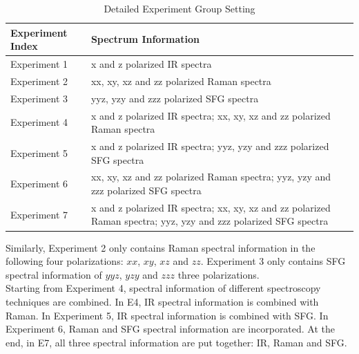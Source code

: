 
\begin{table}\tiny 
\begin{center}
\begin{tabular}{| l | l | l  }
\hline
Experiment Index & Spectrum Information \\
\hline
Experiment 1 & x and z polarized IR spectra\\
\hline
Experiment 2 & xx, xy, xz and zz polarized Raman spectra \\
\hline
Experiment 3 & yyz, yzy and zzz polarized SFG spectra \\
\hline
Experiment 4 & x and z polarized IR spectra; xx, xy, xz and zz polarized Raman spectra \\
\hline
Experiment 5 & x and z polarized IR spectra; yyz, yzy and zzz polarized SFG spectra   \\
\hline
Experiment 6 & xx, xy, xz and zz polarized Raman spectra; yyz, yzy and zzz polarized SFG spectra \\
\hline
Experiment 7 & x and z polarized IR spectra; xx, xy, xz and zz polarized Raman spectra; yyz, yzy and zzz polarized SFG spectra \\
\hline
\end{tabular} 
\end{center}
\caption{Detailed Experiment Group Setting} 
\label{tab:5.1} 
\end{table}	



Similarly, Experiment 2 only contains Raman spectral information in the following four polarizations: $xx$, $xy$, $xz$ and $zz$. Experiment 3 only contains SFG spectral information of $yyz$, $yzy$ and $zzz$ three polarizations. \\

Starting from Experiment 4, spectral information of different spectroscopy techniques are combined. In E4, IR spectral information is combined with Raman. In Experiment 5, IR spectral information is combined with SFG. In Experiment 6, Raman and SFG spectral information are incorporated. At the end, in E7, all three spectral information are put together: IR, Raman and SFG. \\

